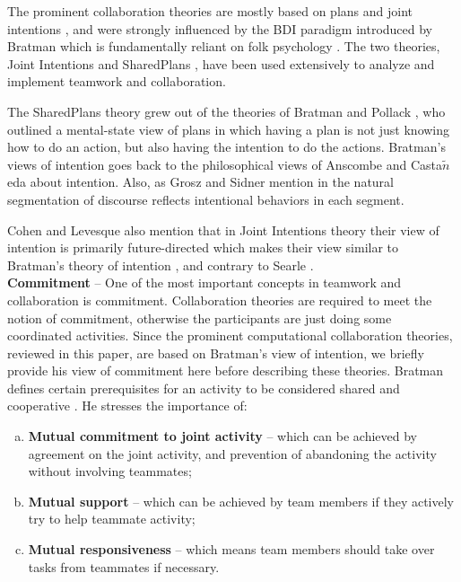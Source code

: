 \documentclass[12pt]{report}
\begin{document}
The prominent collaboration theories are mostly based on plans and joint
intentions \cite{cohen:teamwork} \cite{grosz:plans-discourse}
\cite{Litman:discourse-commonsense}, and were strongly influenced by the BDI
paradigm introduced by Bratman \cite{bratman:intentions-plans} which is
fundamentally reliant on folk psychology \cite{ravenscroft:folk}. The two
theories, Joint Intentions \cite{cohen:teamwork} and SharedPlans
\cite{grosz:plans-discourse}, have been used extensively to analyze and
implement teamwork and collaboration.

The SharedPlans theory grew out of the theories of Bratman and Pollack
\cite{bratman:plans-reasoning,pollack:plan-inference,
pollack:plan-mental-attitudes}, who outlined a mental-state view of plans in
which having a plan is not just knowing how to do an action, but also having the
intention to do the actions. Bratman's views of intention goes back to the
philosophical views of Anscombe \cite{anscombe:intention} and
Casta$\tilde{n}$eda \cite{castaneda:thinking} about intention. Also, as Grosz
and Sidner mention in \cite{grosz:plans-discourse} the natural segmentation of
discourse reflects intentional behaviors in each segment.


Cohen and Levesque also mention that in Joint Intentions theory their view of
intention is primarily future-directed \cite{cohen:intention-commitment} which
makes their view similar to Bratman's theory of intention
\cite{bratman:intention}, and contrary to Searle \cite{searle:collective}.\\

\textbf{Commitment} -- One of the most important concepts in teamwork and
collaboration is commitment. Collaboration theories are required to meet the
notion of commitment, otherwise the participants are just doing some coordinated
activities. Since the prominent computational collaboration theories, reviewed
in this paper, are based on Bratman's view of intention, we briefly provide his
view of commitment here before describing these theories. Bratman defines
certain prerequisites for an activity to be considered shared and cooperative
\cite{bratman:shared-activity}. He stresses the importance of:

\begin{enumerate}[a)]
  \item \textbf{Mutual commitment to joint activity} -- which can be achieved by
  agreement on the joint activity, and prevention of abandoning the activity
  without involving teammates;
  \item \textbf{Mutual support} -- which can be achieved by team members
  if they actively try to help teammate activity;
  \item \textbf{Mutual responsiveness} -- which means team members should take
  over tasks from teammates if necessary.
\end{enumerate}
\end{document}

